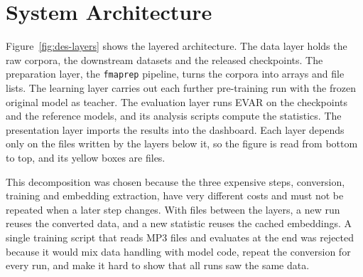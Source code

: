 \documentclass{FastFyp}
\begin{document}
\section{System Architecture}
\label{sec:des-arch}
Figure~\ref{fig:des-layers} shows the layered architecture. The data layer holds the raw corpora, the downstream datasets and the released checkpoints. The preparation layer, the \texttt{fmaprep} pipeline, turns the corpora into arrays and file lists. The learning layer carries out each further pre-training run with the frozen original model as teacher. The evaluation layer runs EVAR on the checkpoints and the reference models, and its analysis scripts compute the statistics. The presentation layer imports the results into the dashboard. Each layer depends only on the files written by the layers below it, so the figure is read from bottom to top, and its yellow boxes are files.

This decomposition was chosen because the three expensive steps, conversion, training and embedding extraction, have very different costs and must not be repeated when a later step changes. With files between the layers, a new run reuses the converted data, and a new statistic reuses the cached embeddings. A single training script that reads MP3 files and evaluates at the end was rejected because it would mix data handling with model code, repeat the conversion for every run, and make it hard to show that all runs saw the same data.
\end{document}
